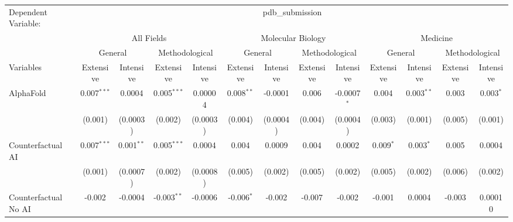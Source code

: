 \begingroup
\centering
\begin{tabular}{lcccccccccccc}
   \tabularnewline \midrule \midrule
   Dependent Variable: & \multicolumn{12}{c}{pdb\_submission}\\
 & \multicolumn{4}{c}{All Fields} & \multicolumn{4}{c}{Molecular Biology} & \multicolumn{4}{c}{Medicine} \\
\cmidrule(lr){2-5} \cmidrule(lr){6-9} \cmidrule(lr){10-13}
 & \multicolumn{2}{c}{General} & \multicolumn{2}{c}{Methodological} & \multicolumn{2}{c}{General} & \multicolumn{2}{c}{Methodological} & \multicolumn{2}{c}{General} & \multicolumn{2}{c}{Methodological} \\
\cmidrule(lr){2-3} \cmidrule(lr){4-5} \cmidrule(lr){6-7} \cmidrule(lr){8-9} \cmidrule(lr){10-11} \cmidrule(lr){12-13}
Variables & \multicolumn{1}{c}{Extensive} & \multicolumn{1}{c}{Intensive} & \multicolumn{1}{c}{Extensive} & \multicolumn{1}{c}{Intensive} & \multicolumn{1}{c}{Extensive} & \multicolumn{1}{c}{Intensive} & \multicolumn{1}{c}{Extensive} & \multicolumn{1}{c}{Intensive} & \multicolumn{1}{c}{Extensive} & \multicolumn{1}{c}{Intensive} & \multicolumn{1}{c}{Extensive} & \multicolumn{1}{c}{Intensive} \\
\cmidrule(lr){1-1}\cmidrule(lr){2-2} \cmidrule(lr){3-3} \cmidrule(lr){4-4} \cmidrule(lr){5-5} \cmidrule(lr){6-6} \cmidrule(lr){7-7} \cmidrule(lr){8-8} \cmidrule(lr){9-9} \cmidrule(lr){10-10} \cmidrule(lr){11-11} \cmidrule(lr){12-12} \cmidrule(lr){13-13}
   AlphaFold                                & 0.007$^{***}$  & 0.0004       & 0.005$^{***}$ & 0.00004    & 0.008$^{**}$ & -0.0001   & 0.006   & -0.0007$^{*}$ & 0.004       & 0.003$^{**}$   & 0.003   & 0.003$^{*}$\\   
                                            & (0.001)        & (0.0003)     & (0.002)       & (0.0003)   & (0.004)      & (0.0004)  & (0.004) & (0.0004)      & (0.003)     & (0.001)        & (0.005) & (0.001)\\   
   Counterfactual AI                        & 0.007$^{***}$  & 0.001$^{**}$ & 0.005$^{***}$ & 0.0004     & 0.004        & 0.0009    & 0.004   & 0.0002        & 0.009$^{*}$ & 0.003$^{*}$    & 0.005   & 0.0004\\   
                                            & (0.001)        & (0.0007)     & (0.002)       & (0.0008)   & (0.005)      & (0.002)   & (0.005) & (0.002)       & (0.005)     & (0.002)        & (0.006) & (0.002)\\   
   Counterfactual No AI                     & -0.002         & -0.0004      & -0.003$^{**}$ & -0.0006    & -0.006$^{*}$ & -0.002    & -0.007  & -0.002        & -0.001      & 0.0004         & -0.003  & 0.00010\\   

\end{tabular}
